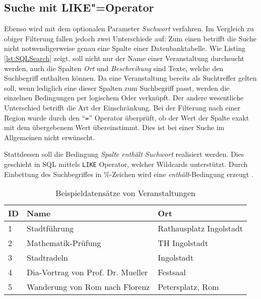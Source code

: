 \subsection{Suche mit LIKE"=Operator}
\label{sec:search_sql_like}

Ebenso wird mit dem optionalen Parameter \emph{Suchwort} verfahren. Im Vergleich zu obiger Filterung fallen jedoch zwei Unterschiede auf: Zum einen betrifft die Suche nicht notwendigerweise genau eine Spalte einer Datenbanktabelle. Wie Listing \ref{lst:SQLSearch} zeigt, soll nicht nur der Name einer Veranstaltung durchsucht werden, auch die Spalten \emph{Ort} und \emph{Beschreibung} sind Texte, welche den Suchbegriff enthalten können. Da eine Veranstaltung bereits als Suchtreffer gelten soll, wenn lediglich eine dieser Spalten zum Suchbegriff passt, werden die einzelnen Bedingungen per logischem Oder verknüpft. Der andere wesentliche Unterschied betrifft die Art der Einschränkung. Bei der Filterung nach einer Region wurde durch den \enquote{\texttt{=}} Operator überprüft, ob der Wert der Spalte exakt mit dem übergebenem Wert übereinstimmt. Dies ist bei einer Suche im Allgemeinen nicht erwünscht.

Stattdessen soll die Bedingung \emph{Spalte enthält Suchwort} realisiert werden. Dies geschieht in SQL mittels \texttt{LIKE} Operator, welcher Wildcards unterstützt. Durch Einbettung des Suchbegriffes in \%-Zeichen wird eine \emph{enthält}-Bedingung erzeugt \cite[S. 110]{Wieken.2009}.


\renewcommand{\arraystretch}{1.2}

\begin{table}[ht!]
\begin{margincap}
\centering
\begin{tabularx}{0.9\textwidth}{lll}
ID & Name & Ort\\
\hline
1 & Stadtführung & Rathausplatz Ingolstadt \\
2 & Mathematik-Prüfung & TH Ingolstadt \\
3 & Stadtradeln & Ingolstadt \\
4 & Dia-Vortrag von Prof. Dr. Mueller & Festsaal \\
5 & Wanderung von Rom nach Florenz & Petersplatz, Rom\\
\end{tabularx}
\caption{Beispieldatensätze von Veranstaltungen}
\label{tab:events.examples.sql}
\end{margincap}
\end{table}


